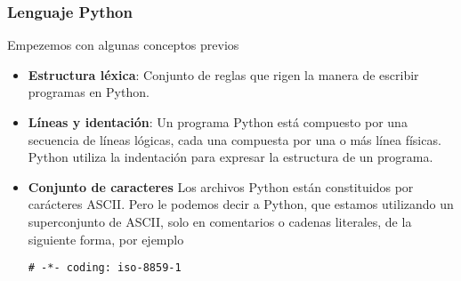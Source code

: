 \documentclass[10pt]{beamer}
\begin{document}
\begin{frame}[fragile]
\frametitle{Lenguaje Python}

\vspace{0.2cm}

Empezemos con algunas conceptos previos

\begin{itemize}
\item \textbf{Estructura l\'exica}: Conjunto de reglas que rigen la manera de escribir programas en Python.
\item \textbf{L\'ineas y identaci\'on}: Un programa Python est\'a compuesto por una secuencia de l\'ineas l\'ogicas, cada una compuesta por una o m\'as l\'inea f\'isicas. Python utiliza la indentaci\'on para expresar la estructura de un programa.

\item \textbf{Conjunto de caracteres} Los archivos Python est\'an constituidos por car\'acteres ASCII. Pero le podemos decir a Python, que estamos utilizando un superconjunto de ASCII, solo en comentarios o  cadenas literales, de la siguiente forma, por ejemplo

\begin{lstlisting}
# -*- coding: iso-8859-1
\end{lstlisting}
\end{itemize}

\end{frame}
\end{document}

